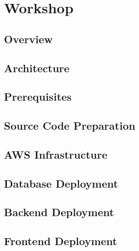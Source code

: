 \newpage

\section{Workshop}



\subsection{Overview}


\subsection{Architecture}


\subsection{Prerequisites}


\subsection{Source Code Preparation}


\subsection{AWS Infrastructure}


\subsection{Database Deployment}


\subsection{Backend Deployment}


\subsection{Frontend Deployment}


